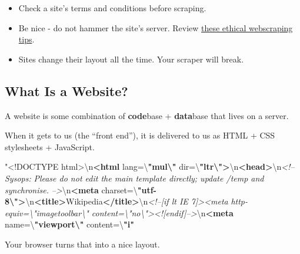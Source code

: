 \documentclass[
]{book}
\newenvironment{Shaded}{\begin{snugshade}}{\end{snugshade}}
\newcommand{\CommentTok}[1]{\textcolor[rgb]{0.56,0.35,0.01}{\textit{#1}}}
\newcommand{\DataTypeTok}[1]{\textcolor[rgb]{0.13,0.29,0.53}{#1}}
\newcommand{\ErrorTok}[1]{\textcolor[rgb]{0.64,0.00,0.00}{\textbf{#1}}}
\newcommand{\KeywordTok}[1]{\textcolor[rgb]{0.13,0.29,0.53}{\textbf{#1}}}
\newcommand{\NormalTok}[1]{#1}
\newcommand{\OtherTok}[1]{\textcolor[rgb]{0.56,0.35,0.01}{#1}}
\newcommand{\StringTok}[1]{\textcolor[rgb]{0.31,0.60,0.02}{#1}}
\providecommand{\tightlist}{%
  \setlength{\itemsep}{0pt}\setlength{\parskip}{0pt}}
\begin{document}
\begin{itemize}
\tightlist
\item
  Check a site's terms and conditions before scraping.
\item
  Be nice - do not hammer the site's server. Review \href{https://towardsdatascience.com/ethics-in-web-scraping-b96b18136f01}{these ethical webscraping tips}.
\item
  Sites change their layout all the time. Your scraper will break.
\end{itemize}

\hypertarget{what-is-a-website}{%
\subsection{What Is a Website?}\label{what-is-a-website}}

A website is some combination of \textbf{code}base + \textbf{data}base that lives on a server.

When it gets to us (the ``front end''), it is delivered to us as HTML + CSS stylesheets + JavaScript.

\begin{Shaded}
\begin{Highlighting}[]
\NormalTok{"}\DataTypeTok{<!DOCTYPE }\NormalTok{html}\DataTypeTok{>}\NormalTok{\textbackslash{}n}\KeywordTok{<html}\OtherTok{ lang=}\StringTok{\textbackslash{}}\ErrorTok{"mul\textbackslash{}"}\OtherTok{ dir=}\StringTok{\textbackslash{}}\ErrorTok{"ltr\textbackslash{}"}\KeywordTok{>}\NormalTok{\textbackslash{}n}\KeywordTok{<head>}\NormalTok{\textbackslash{}n}\CommentTok{<!-- Sysops: }
\CommentTok{Please do not edit the main template directly; update /temp and synchronise. }
\CommentTok{-->}\NormalTok{\textbackslash{}n}\KeywordTok{<meta}\OtherTok{ charset=}\StringTok{\textbackslash{}}\ErrorTok{"utf-8\textbackslash{}"}\KeywordTok{>}\NormalTok{\textbackslash{}n}\KeywordTok{<title>}\NormalTok{Wikipedia}\KeywordTok{</title>}\NormalTok{\textbackslash{}n}\CommentTok{<!--[if lt IE 7]><meta}
\CommentTok{http-equiv=\textbackslash{}"imagetoolbar\textbackslash{}" content=\textbackslash{}"no\textbackslash{}"><![endif]-->}\NormalTok{\textbackslash{}n}\KeywordTok{<meta}\OtherTok{ name=}\StringTok{\textbackslash{}}\ErrorTok{"viewport\textbackslash{}"}
\OtherTok{content=}\StringTok{\textbackslash{}}\ErrorTok{"i"}
\end{Highlighting}
\end{Shaded}

Your browser turns that into a nice layout.
\end{document}
